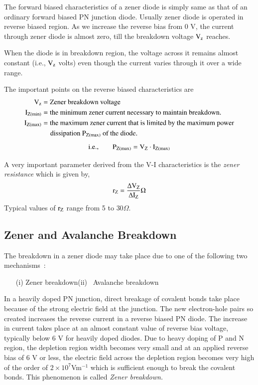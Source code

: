 The forward biased characteristics of a zener diode is simply same as that of an ordinary forward biased PN junction diode. Usually zener diode is operated in reverse biased region. As we increase the reverse bias from 0 V, the current through zener diode is almost zero, till the breakdown voltage $\textrm{V}_{\textrm{z}}$ reaches.

When the diode is in breakdown region, the voltage across it remains almost constant (i.e., $\textrm{V}_{\textrm{z}}$ volts) even though the current varies through it over a wide range.

The important points on the reverse biased characteristics are
\begin{align*}
\textrm{V}_{\textrm{z}} &= \text{Zener breakdown voltage}\\
\textrm{I}_{\textrm{Z}(\min)} &= \text{the minimum zener current necessary to maintain breakdown.}\\
\textrm{I}_{\textrm{Z}(\max)} &= \text{the maximum zener current that is limited by the maximum power}\\
               &\quad~ \text{dissipation $\textrm{P}_{\textrm{Z}(\max)}$ of the diode.}
\end{align*}
\begin{equation}
\text{i.e.,}\qquad \textrm{P}_{\textrm{Z}(\max)}=\textrm{V}_{\textrm{Z}}\cdot \textrm{I}_{\textrm{Z}(\max)}\label{eq1.58}
\end{equation}

A very important parameter derived from the V-I characteristics is the {\em zener resistance} which is given by,
\begin{equation}
\textrm{r}_{\textrm{Z}}=\dfrac{\Delta \textrm{V}_{\textrm{Z}}}{\Delta \textrm{I}_{\textrm{Z}}}\Omega\label{eq1.59}
\end{equation}
Typical values of $\textrm{r}_{\textrm{Z}}$ range from 5 to $30\Omega$.

\subsection{Zener and Avalanche Breakdown}\label{sec1.12.1}

The breakdown in a zener diode may take place due to one of the following two mechanisms~:
\begin{itemize}
\item[(i)] Zener breakdown\qquad (ii)~ Avalanche breakdown
\end{itemize}

In a heavily doped PN junction, direct breakage of covalent bonds take place because of the strong electric field at the junction. The new electron-hole pairs so created increases the reverse current in a reverse biased PN diode. The increase in current takes place at an almost constant value of reverse bias voltage, typically below 6 V for heavily doped diodes. Due to heavy doping of P and N region, the depletion region width becomes very small and at an applied reverse bias of 6 V or less, the electric field across the depletion region becomes very high of the order of $2\times 10^{7}$Vm$^{-1}$ which is sufficient enough to break the covalent bonds. This phenomenon is called {\em Zener breakdown.}

